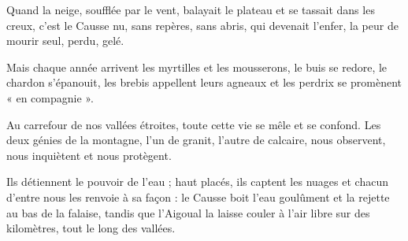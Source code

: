 Quand la neige, soufflée par le vent, balayait le plateau et se tassait dans les creux, c’est le
Causse nu, sans repères, sans abris, qui devenait l’enfer, la peur de mourir seul, perdu, gelé.

Mais chaque année arrivent les myrtilles et les mousserons, le buis se redore, le chardon
s’épanouit, les brebis appellent leurs agneaux et les perdrix se promènent « en compagnie ».

Au carrefour de nos vallées étroites, toute cette vie se mêle et se confond. Les deux génies de
la montagne, l’un de granit, l’autre de calcaire, nous observent, nous inquiètent et nous
protègent.

Ils détiennent le pouvoir de l’eau ; haut placés, ils captent les nuages et chacun d’entre nous
les renvoie à sa façon : le Causse boit l’eau goulûment et la rejette au bas de la falaise, tandis
que l’Aigoual la laisse couler à l’air libre sur des kilomètres, tout le long des vallées.
